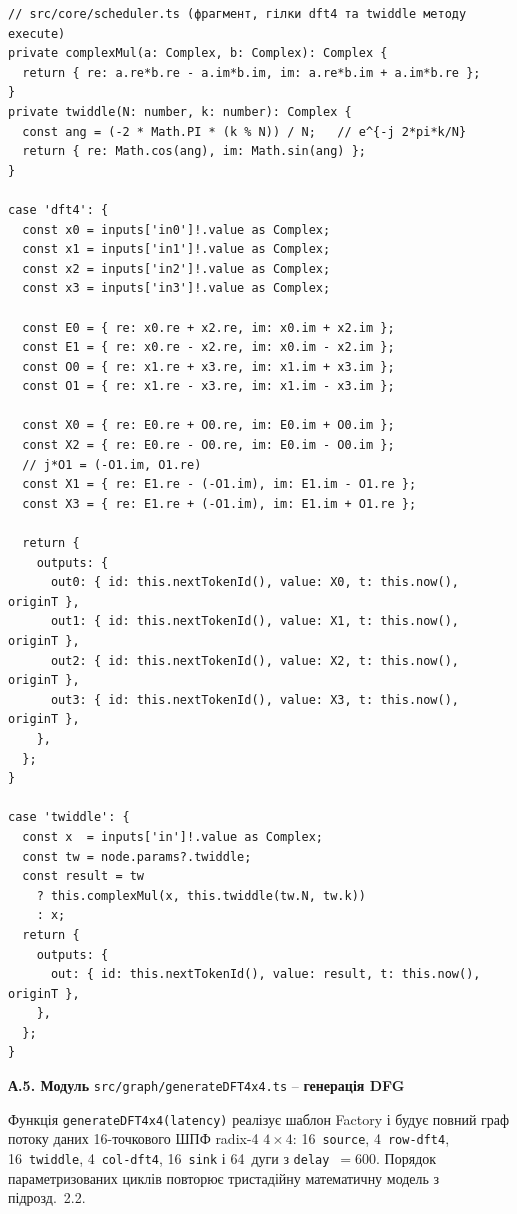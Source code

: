 \documentclass[
]{article}
\begin{document}
\begin{verbatim}
// src/core/scheduler.ts (фрагмент, гілки dft4 та twiddle методу execute)
private complexMul(a: Complex, b: Complex): Complex {
  return { re: a.re*b.re - a.im*b.im, im: a.re*b.im + a.im*b.re };
}
private twiddle(N: number, k: number): Complex {
  const ang = (-2 * Math.PI * (k % N)) / N;   // e^{-j 2*pi*k/N}
  return { re: Math.cos(ang), im: Math.sin(ang) };
}

case 'dft4': {
  const x0 = inputs['in0']!.value as Complex;
  const x1 = inputs['in1']!.value as Complex;
  const x2 = inputs['in2']!.value as Complex;
  const x3 = inputs['in3']!.value as Complex;

  const E0 = { re: x0.re + x2.re, im: x0.im + x2.im };
  const E1 = { re: x0.re - x2.re, im: x0.im - x2.im };
  const O0 = { re: x1.re + x3.re, im: x1.im + x3.im };
  const O1 = { re: x1.re - x3.re, im: x1.im - x3.im };

  const X0 = { re: E0.re + O0.re, im: E0.im + O0.im };
  const X2 = { re: E0.re - O0.re, im: E0.im - O0.im };
  // j*O1 = (-O1.im, O1.re)
  const X1 = { re: E1.re - (-O1.im), im: E1.im - O1.re };
  const X3 = { re: E1.re + (-O1.im), im: E1.im + O1.re };

  return {
    outputs: {
      out0: { id: this.nextTokenId(), value: X0, t: this.now(), originT },
      out1: { id: this.nextTokenId(), value: X1, t: this.now(), originT },
      out2: { id: this.nextTokenId(), value: X2, t: this.now(), originT },
      out3: { id: this.nextTokenId(), value: X3, t: this.now(), originT },
    },
  };
}

case 'twiddle': {
  const x  = inputs['in']!.value as Complex;
  const tw = node.params?.twiddle;
  const result = tw
    ? this.complexMul(x, this.twiddle(tw.N, tw.k))
    : x;
  return {
    outputs: {
      out: { id: this.nextTokenId(), value: result, t: this.now(), originT },
    },
  };
}
\end{verbatim}

\textbf{А.5. Модуль} \texttt{src/graph/generateDFT4x4.ts} --
\textbf{генерація DFG}

Функція \texttt{generateDFT4x4(latency)} реалізує шаблон Factory і
будує повний граф потоку даних 16-точкового ШПФ radix-4 \(4 \times 4\):
16~\texttt{source}, 4~\texttt{row-dft4}, 16~\texttt{twiddle},
4~\texttt{col-dft4}, 16~\texttt{sink} і 64~дуги з \texttt{delay}~\(=
600\). Порядок параметризованих циклів повторює тристадійну
математичну модель з підрозд.~2.2.
\end{document}
